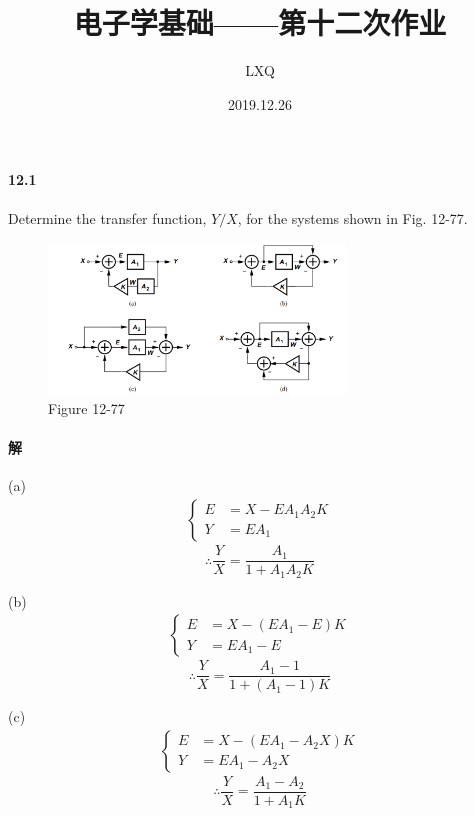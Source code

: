 \documentclass[hyperref, UTF8]{ctexart}
\title{电子学基础——第十二次作业}
\author{LXQ}
\date{2019.12.26}
\begin{document}
\maketitle

\paragraph{12.1} \label{12.1}
    Determine the transfer function, $Y/X$, for the systems shown in Fig. 12-77.
    \begin{figure}[!htb]
        \centering
        \includegraphics[width=0.701\textwidth]{p12-77.png}
        \caption*{Figure 12-77}
    \end{figure}        
\paragraph{解}
    (a) 
    \begin{gather*} \left\{ \begin{aligned}
        E & = X - EA_1A_2K \\
        Y & = EA_1
    \end{aligned} \right. \end{gather*}
    $$\therefore \frac{Y}{X} = \frac{A_1}{1+A_1A_2K}$$

    (b)
    \begin{gather*} \left\{ \begin{aligned}
        E & = X - (EA_1-E)K \\
        Y & = EA_1 - E
    \end{aligned} \right. \end{gather*}
    $$\therefore \frac{Y}{X} = \frac{A_1-1}{1+(A_1-1)K}$$

    (c)
    \begin{gather*} \left\{ \begin{aligned}
        E & = X - (EA_1 - A_2X)K \\
        Y & = EA_1 - A_2X 
    \end{aligned} \right. \end{gather*}
    $$\therefore \frac{Y}{X} = \frac{A_1 - A_2}{1+A_1K}$$
\end{document}
